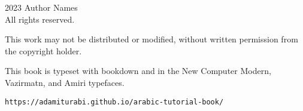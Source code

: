 \thispagestyle{empty}
\begingroup
\footnotesize
\parindent 0pt
\parskip \baselineskip
\textcopyright{} 2023 Author Names \\
All rights reserved.

    This work may not be distributed or modified, without written permission from the copyright holder.

\texttt{\gitTag}

This book is typeset with bookdown and \XeLaTeX 
in the New Computer Modern, Vazirmatn, and Amiri typefaces.

\vfill

\texttt{https://adamiturabi.github.io/arabic-tutorial-book/}

\vspace*{2\baselineskip}


\endgroup
\clearpage
